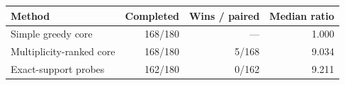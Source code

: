 \begin{tabular}{lrrr}
\toprule
Method & Completed & Wins / paired & Median ratio\\
\midrule
Simple greedy core & 168/180 & --- & 1.000\\
Multiplicity-ranked core & 168/180 & 5/168 & 9.034\\
Exact-support probes & 162/180 & 0/162 & 9.211\\
\bottomrule
\end{tabular}
